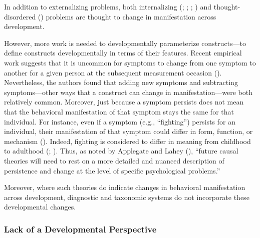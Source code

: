 \documentclass[
  american,
  letterpaper,
  12pt]{article}
\begin{document}
\par\endgroup\addvspace{\baselineskip}

In addition to externalizing problems, both internalizing
(;
;
; ) and thought-disordered () problems are thought to change in manifestation across
development.

However, more work is needed to developmentally parameterize
constructs---to define constructs developmentally in terms of their
features. Recent empirical work suggests that it is uncommon for
symptoms to change from one symptom to another for a given person at the
subsequent measurement occasion (). Nevertheless, the authors found that adding new
symptoms and subtracting symptoms---other ways that a construct can
change in manifestation---were both relatively common. Moreover, just
because a symptom persists does not mean that the behavioral
manifestation of that symptom stays the same for that individual. For
instance, even if a symptom (e.g., ``fighting'') persists for an
individual, their manifestation of that symptom could differ in form,
function, or mechanism ().
Indeed, fighting is considered to differ in meaning from childhood to
adulthood (;
). Thus, as noted by
Applegate and Lahey (),
``future causal theories will need to rest on a more detailed and
nuanced description of persistence and change at the level of specific
psychological problems.''

Moreover, where such theories do indicate changes in behavioral
manifestation across development, diagnostic and taxonomic systems do
not incorporate these developmental changes.

\subsubsection{Lack of a Developmental
Perspective}\label{lack-of-a-developmental-perspective}
\end{document}
